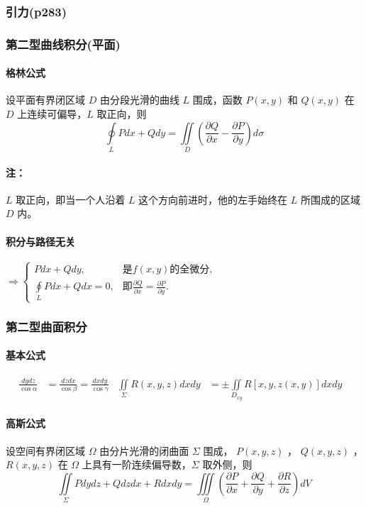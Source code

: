 ﻿\documentclass[a4paper,12pt,UTF8]{ctexart}
\begin{document}
    \subsubsection{引力(p283)}

    \subsubsection{第二型曲线积分(平面)}

    \paragraph{格林公式} 设平面有界闭区域 \(D\) 由分段光滑的曲线 \(L\) 围成，函数 \(P(x, y)\) 和 \(Q(x, y)\) 在 \(D\) 上连续可偏导，\(L\) 取正向，则
    \[ \oint \limits_{L} Pdx+Qdy = \iint \limits_{D} \left( \frac{\partial Q}{\partial x} - \frac{\partial P}{\partial y} \right)d\sigma \]
    \paragraph{注：} \(L\) 取正向，即当一个人沿着 \(L\) 这个方向前进时，他的左手始终在 \(L\) 所围成的区域 \(D\) 内。
    
    \paragraph{积分与路径无关}
    \(\Rightarrow \begin{cases}
        Pdx+Qdy,& \text{是} f(x, y) \text{的全微分},\\
        \oint \limits_{L} Pdx+Qdx = 0,& \text{即} \frac{\partial Q}{\partial x} = \frac{\partial P}{\partial y}.
    \end{cases}\)

    \subsubsection{第二型曲面积分}
    \paragraph{基本公式}
    \begin{align*}
        \frac{dydz}{\cos \alpha}&=\frac{dzdx}{\cos \beta}=\frac{dxdy}{\cos \gamma}& \iint \limits_{\Sigma} R(x,y,z)dxdy&=\pm \iint \limits_{D_{xy}} R[x,y,z(x,y)]dxdy&
    \end{align*}

    \paragraph{高斯公式} 设空间有界闭区域 \(\Omega\) 由分片光滑的闭曲面 \(\Sigma \) 围成， \(P(x, y, z)\) ， \(Q(x, y, z)\) ， \(R(x, y, z)\) 在 \(\Omega\) 上具有一阶连续偏导数，\(\Sigma\) 取外侧，则
    \[\iint \limits_{\Sigma} Pdydz+Qdzdx+Rdxdy=\iiint \limits_{\Omega} \left( \frac{\partial P}{\partial x} + \frac{\partial Q}{\partial y} + \frac{\partial R}{\partial z} \right)dV^{}\]
\end{document}
